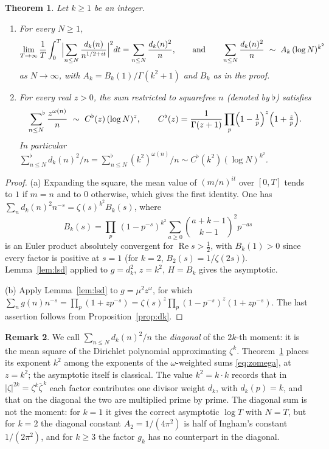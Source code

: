 \documentclass[11pt]{amsart}
\newtheorem{theorem}{Theorem}[section]
\theoremstyle{definition}
\newtheorem{remark}[theorem]{Remark}
\newcommand{\re}{\operatorname{Re}}
\newcommand{\half}{\tfrac12}
\newcommand{\dk}{d_k}
\begin{document}
\begin{theorem}\label{thm:weight}
Let $k\ge1$ be an integer.
\begin{enumerate}[label=\textup{(\alph*)}]
\item For every $N\ge1$,
\[
\lim_{T\to\infty}\frac1T\int_0^T\Bigl|\sum_{n\le N}\frac{\dk(n)}{n^{1/2+it}}\Bigr|^2dt=\sum_{n\le N}\frac{\dk(n)^2}{n},
\qquad\text{and}\qquad
\sum_{n\le N}\frac{\dk(n)^2}{n}\ \sim\ A_k\,(\log N)^{k^2}
\]
as $N\to\infty$, with $A_k=B_k(1)/\Gamma(k^2+1)$ and $B_k$ as in the proof.
\item For every real $z>0$, the sum restricted to squarefree $n$ (denoted by $\flat$) satisfies
\[
\sideset{}{^\flat}\sum_{n\le N}\frac{z^{\omega(n)}}{n}\ \sim\ C^{\flat}(z)\,(\log N)^{z},\qquad
C^{\flat}(z)=\frac1{\Gamma(z+1)}\prod_p\Bigl(1-\tfrac1p\Bigr)^{z}\Bigl(1+\tfrac zp\Bigr).
\]
In particular $\sum^{\flat}_{n\le N}\dk(n)^2/n=\sum^{\flat}_{n\le N}(k^2)^{\omega(n)}/n\sim
C^{\flat}(k^2)(\log N)^{k^2}$.
\end{enumerate}
\end{theorem}
\begin{proof}
(a) Expanding the square, the mean value of $(m/n)^{it}$ over $[0,T]$ tends to $1$ if $m=n$ and to $0$
otherwise, which gives the first identity. One has $\sum_n\dk(n)^2n^{-s}=\zeta(s)^{k^2}B_k(s)$, where
\[
B_k(s)=\prod_p\,(1-p^{-s})^{k^2}\sum_{a\ge0}\binom{a+k-1}{k-1}^2p^{-as}
\]
is an Euler product absolutely convergent for $\re s>\half$, with $B_k(1)>0$ since every factor is positive at
$s=1$ (for $k=2$, $B_2(s)=1/\zeta(2s)$). Lemma~\ref{lem:lsd} applied to $g=\dk^2$, $z=k^2$, $H=B_k$ gives the
asymptotic.

(b) Apply Lemma~\ref{lem:lsd} to $g=\mu^2z^{\omega}$, for which
$\sum_ng(n)n^{-s}=\prod_p(1+zp^{-s})=\zeta(s)^z\prod_p(1-p^{-s})^z(1+zp^{-s})$. The last assertion follows from
Proposition~\ref{prop:dk}.
\end{proof}

\begin{remark}
We call $\sum_{n\le N}\dk(n)^2/n$ the \emph{diagonal} of the $2k$-th moment: it is the mean square of the
Dirichlet polynomial approximating $\zeta^k$. Theorem~\ref{thm:weight} places its exponent $k^2$ among the
exponents of the $\omega$-weighted sums \eqref{eq:zomega}, at $z=k^2$; the asymptotic itself is classical. The
value $k^2=k\cdot k$ records that in $|\zeta|^{2k}=\zeta^k\overline{\zeta}^{\,k}$ each factor contributes one
divisor weight $\dk$, with $\dk(p)=k$, and that on the diagonal the two are multiplied prime by prime. The
diagonal sum is not the moment: for $k=1$ it gives the correct asymptotic $\log T$ with $N=T$, but for $k=2$
the diagonal constant $A_2=1/(4\pi^2)$ is half of Ingham's constant $1/(2\pi^2)$, and for $k\ge3$ the factor
$g_k$ has no counterpart in the diagonal.
\end{remark}
\end{document}
